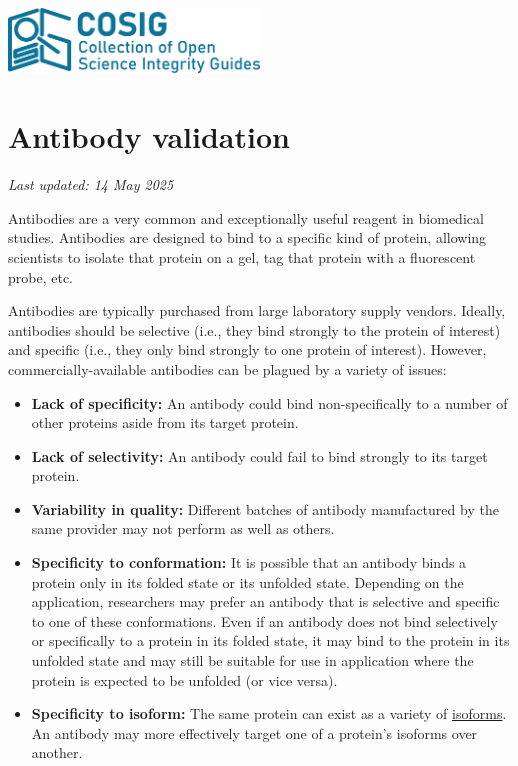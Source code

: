 \documentclass[letterpaper, 12pt]{article}
\begin{document}
\flushleft
\includegraphics[width=0.5\textwidth]{img/home/241017_final_logo_mockup.png}

\section*{Antibody validation}
\textit{Last updated: 14 May 2025}

Antibodies are a very common and exceptionally useful reagent in biomedical studies. Antibodies are designed to bind to a specific kind of protein, allowing scientists to isolate that protein on a gel, tag that protein with a fluorescent probe, etc.

Antibodies are typically purchased from large laboratory supply vendors. Ideally, antibodies should be selective (i.e., they bind strongly to the protein of interest) and specific (i.e., they only bind strongly to one protein of interest). However, commercially-available antibodies can be plagued by a variety of issues:

\begin{itemize}
    \setlength\itemsep{-0.5em}
    \item \textbf{Lack of specificity:} An antibody could bind non-specifically to a number of other proteins aside from its target protein.
    \item \textbf{Lack of selectivity:} An antibody could fail to bind strongly to its target protein.
    \item \textbf{Variability in quality:} Different batches of antibody manufactured by the same provider may not perform as well as others.
    \item \textbf{Specificity to conformation:} It is possible that an antibody binds a protein only in its folded state or its unfolded state. Depending on the application, researchers may prefer an antibody that is selective and specific to one of these conformations. Even if an antibody does not bind selectively or specifically to a protein in its folded state, it may bind to the protein in its unfolded state and may still be suitable for use in application where the protein is expected to be unfolded (or vice versa).
    \item \textbf{Specificity to isoform:} The same protein can exist as a variety of \href{https://en.wikipedia.org/wiki/Protein_isoform}{isoforms}. An antibody may more effectively target one of a protein's isoforms over another.
\end{itemize}
\end{document}
